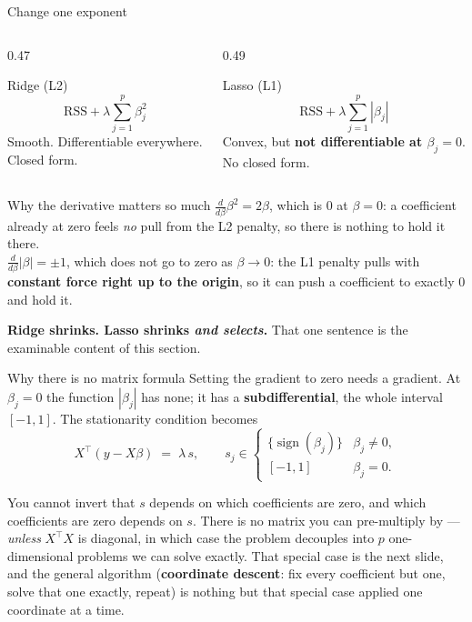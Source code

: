 \documentclass[aspectratio=169]{beamer}
\begin{document}
\begin{frame}[shrink=6]{Change one exponent}
  \begin{columns}[T]
    \begin{column}{0.47\textwidth}
      \begin{block}{Ridge (L2)}
        \[ \text{RSS} + \lambda \sum_{j=1}^{p} \beta_j^2 \]
        Smooth. Differentiable everywhere. Closed form.
      \end{block}
    \end{column}
    \begin{column}{0.49\textwidth}
      \begin{block}{Lasso (L1)}
        \[ \text{RSS} + \lambda \sum_{j=1}^{p} |\beta_j| \]
        Convex, but \textbf{not differentiable at $\beta_j = 0$}. No closed
        form.
      \end{block}
    \end{column}
  \end{columns}
  \vspace{0.3em}
  \begin{alertblock}{Why the derivative matters so much}
    \small $\frac{d}{d\beta}\beta^2 = 2\beta$, which is $0$ at $\beta = 0$: a
    coefficient already at zero feels \emph{no} pull from the L2 penalty, so
    there is nothing to hold it there.\\[0.3em]
    $\frac{d}{d\beta}|\beta| = \pm 1$, which does not go to zero as
    $\beta \to 0$: the L1 penalty pulls with \textbf{constant force right up
    to the origin}, so it can push a coefficient to exactly $0$ and hold it.
  \end{alertblock}
  \begin{center}\small
    \textbf{Ridge shrinks. Lasso shrinks \emph{and selects}.} That one
    sentence is the examinable content of this section.
  \end{center}
\end{frame}

\begin{frame}[shrink=8]{Why there is no matrix formula}
  Setting the gradient to zero needs a gradient. At $\beta_j = 0$ the function
  $|\beta_j|$ has none; it has a \textbf{subdifferential}, the whole interval
  $[-1, 1]$. The stationarity condition becomes
  \[
    X^{\!\top}(y - X\beta) \;=\; \lambda\,s,
    \qquad
    s_j \in
    \begin{cases}
      \{\operatorname{sign}(\beta_j)\} & \beta_j \ne 0,\\[2pt]
      [-1, 1] & \beta_j = 0 .
    \end{cases}
  \]
  \begin{block}{You cannot invert that}
    \small $s$ depends on which coefficients are zero, and which coefficients
    are zero depends on $s$. There is no matrix you can pre-multiply by ---
    \emph{unless} $X^{\!\top}\!X$ is diagonal, in which case the problem
    decouples into $p$ one-dimensional problems we can solve exactly. That
    special case is the next slide, and the general algorithm
    (\textbf{coordinate descent}: fix every coefficient but one, solve that
    one exactly, repeat) is nothing but that special case applied one
    coordinate at a time.
  \end{block}
\end{frame}
\end{document}
